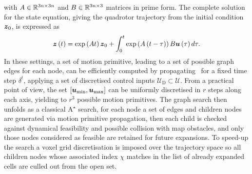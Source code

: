 with $A \in \mathbb{R}^{3n \times 3n}$ and $B \in \mathbb{R}^{3n \times 3}$ matrices in prime form.
The complete solution for the state equation, giving the quadrotor trajectory from the initial condition $\boldsymbol{z}_0$, is expressed as
\begin{equation}
	\label{EQ:MOTION-PRIMITIVE}
	\boldsymbol{z}\left( t \right) = \exp \left( At \right)\boldsymbol{z}_0 + \int_{0}^{t} \exp \left( A \left( t-\tau \right) \right) B \boldsymbol{u}\left( \tau \right) d\tau.
\end{equation}
In these settings, a set of motion primitive, leading to a set of possible graph edges for each node, can be efficiently computed
by propagating~ for a fixed time step $\delta^t$, applying a set of discretised control inputs
$\mathcal{U}_{\text{D}} \subset \mathcal{U}$. From a practical point of view, the set $\left[ \boldsymbol{u}_{\text{min}}, \boldsymbol{u}_{\text{max}} \right]$
can be uniformly discretised in $r$ steps along each axis, yielding to $r^3$ possible motion primitives.
The graph search then unfolds as a classical A$^{\star}$ search, for each node a set of edges and children nodes are generated via motion
primitive propagation, then each child is checked against dynamical feasibility and possible collision with map obstacles, and only those
nodes considered as feasible are retained for future expansions.
To speed-up the search a voxel grid discretisation is imposed over the trajectory space so all children nodes whose associated index $\chi$
matches in the list of already expanded cells are culled out from the open set.

